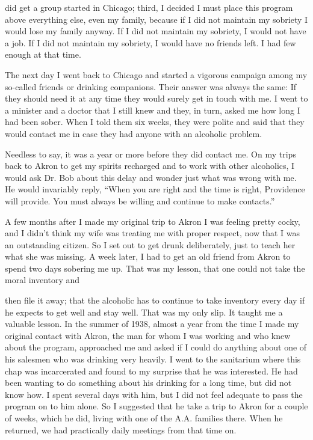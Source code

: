 \begin{biblechapter}
did get a group started in Chicago; third, I decided I must place this program above everything else, even my family, because if I did not maintain my sobriety I would lose my family anyway. If I did not maintain my sobriety, I would not have a job. If I did not maintain my sobriety, I would have no friends left. I had few enough at that time.

The next day I went back to Chicago and started a vigorous campaign among my so-called friends or drinking companions. Their answer was always the same: If they should need it at any time they would surely get in touch with me. I went to a minister and a doctor that I still knew and they, in turn, asked me how long I had been sober. When I told them six weeks, they were polite and said that they would contact me in case they had anyone with an alcoholic problem.

Needless to say, it was a year or more before they did contact me. On my trips back to Akron to get my spirits recharged and to work with other alcoholics, I would ask Dr. Bob about this delay and wonder just what was wrong with me. He would invariably reply, “When you are right and the time is right, Providence will provide. You must always be willing and continue to make contacts.”

A few months after I made my original trip to Akron I was feeling pretty cocky, and I didn’t think my wife was treating me with proper respect, now that I was an outstanding citizen. So I set out to get drunk deliberately, just to teach her what she was missing. A week later, I had to get an old friend from Akron to spend two days sobering me up. That was my lesson, that one could not take the moral inventory and

then file it away; that the alcoholic has to continue to take inventory every day if he expects to get well and stay well. That was my only slip. It taught me a valuable lesson. In the summer of 1938, almost a year from the time I made my original contact with Akron, the man for whom I was working and who knew about the program, approached me and asked if I could do anything about one of his salesmen who was drinking very heavily. I went to the sanitarium where this chap was incarcerated and found to my surprise that he was interested. He had been wanting to do something about his drinking for a long time, but did not know how. I spent several days with him, but I did not feel adequate to pass the program on to him alone. So I suggested that he take a trip to Akron for a couple of weeks, which he did, living with one of the A.A. families there. When he returned, we had practically daily meetings from that time on.


\end{biblechapter}
